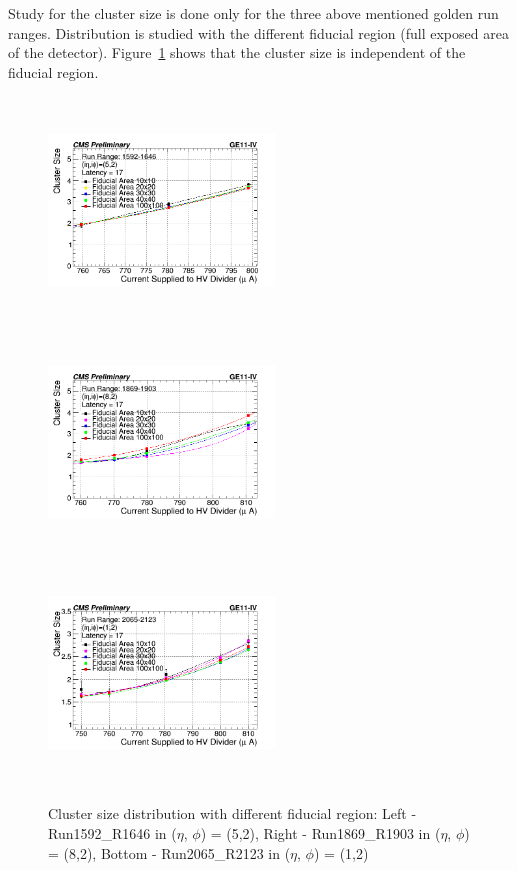Study for the cluster size is done only for the three above mentioned golden run ranges. Distribution is studied with the different fiducial region (full exposed area of the detector). Figure~\ref{fig:CSDfiducialregion} shows that the cluster size is independent of the fiducial region.
\begin{figure}[!htbp]
    \begin{center}

      \includegraphics[width=6cm,height=6cm]{figures/GEM/CurrentvsClusterSizeR1592R1646.png}
      \includegraphics[width=6cm,height=6cm]{figures/GEM/CurrentvsClusterSizeR1869R1903.png}
      \includegraphics[width=6cm,height=6cm]{figures/GEM/CurrentvsClusterSizeR2065R2123.png}
    \end{center}
    \caption{Cluster size distribution with different fiducial region: Left - Run1592\_R1646 in ($\eta$, $\phi$) = (5,2), Right - Run1869\_R1903 in ($\eta$, $\phi$) = (8,2), Bottom - Run2065\_R2123 in ($\eta$, $\phi$) = (1,2)}
  \label{fig:CSDfiducialregion}
\end{figure}
